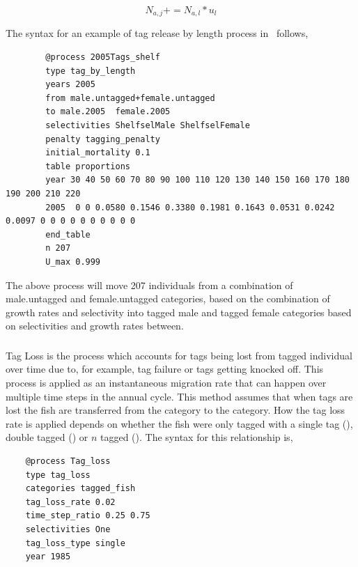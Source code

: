 $$N_{a,j} += N_{a,l} * u_l$$

The syntax for an example of tag release by length process in \CNAME\ follows, 
{\small{\begin{verbatim}
		@process 2005Tags_shelf
		type tag_by_length 
		years 2005
		from male.untagged+female.untagged
		to male.2005  female.2005	
		selectivities ShelfselMale ShelfselFemale
		penalty tagging_penalty
		initial_mortality 0.1
		table proportions
		year 30 40 50 60 70 80 90 100 110 120 130 140 150 160 170 180 190 200 210 220
		2005  0 0 0.0580 0.1546 0.3380 0.1981 0.1643 0.0531 0.0242 0.0097 0 0 0 0 0 0 0 0 0 0
		end_table
		n 207
		U_max 0.999
		\end{verbatim}}}

The above process will move 207 individuals from a combination of male.untagged and female.untagged categories, based on the combination of growth rates and selectivity into tagged male and tagged female categories based on selectivities and growth rates between.

\subsubsection{}

Tag Loss is the process which accounts for tags being lost from tagged individual over time due to, for example, tag failure or tags getting knocked off. This process is applied as an instantaneous migration rate that can happen over multiple time steps in the annual cycle. This method assumes that when tags are lost the fish are transferred from the  category to the  category. How the tag loss rate is applied depends on whether the fish were only tagged with a single tag (), double tagged () or $n$ tagged (). The syntax for this relationship is,

{\small{\begin{verbatim}
	@process Tag_loss
	type tag_loss
	categories tagged_fish
	tag_loss_rate 0.02
	time_step_ratio 0.25 0.75
	selectivities One
	tag_loss_type single
	year 1985
		\end{verbatim}}}

\subsection{\label{sec:derived-quantities}}

